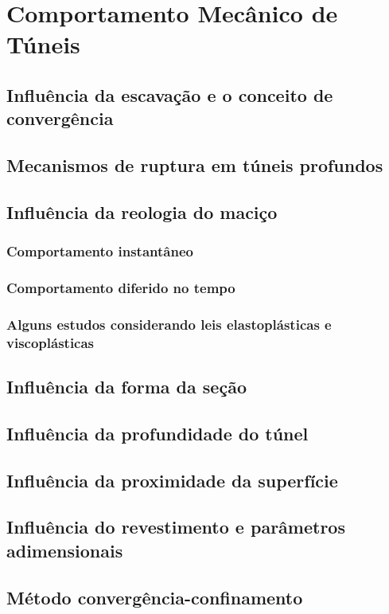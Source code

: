 \chapter{Comportamento Mecânico de Túneis}

\section{Influência da escavação e o conceito de convergência}


\section{Mecanismos de ruptura em túneis profundos}

\section{Influência da reologia do maciço}

\subsection{Comportamento instantâneo}

\subsection{Comportamento diferido no tempo}

\subsection{Alguns estudos considerando leis elastoplásticas e viscoplásticas}

\section{Influência da forma da seção}

\section{Influência da profundidade do túnel}

\section{Influência da proximidade da superfície}

\section{Influência do revestimento e parâmetros adimensionais}

\section{Método convergência-confinamento}




